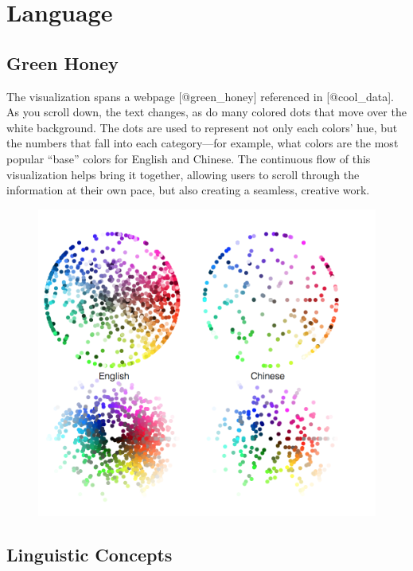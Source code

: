 \documentclass[]{book}
\theoremstyle{definition}
\theoremstyle{definition}
\theoremstyle{definition}
\theoremstyle{remark}
\begin{document}
\section{Language}\label{language}

\subsection{Green Honey}\label{green-honey}

The visualization spans a webpage {[}@green\_honey{]} referenced in
{[}@cool\_data{]}. As you scroll down, the text changes, as do many
colored dots that move over the white background. The dots are used to
represent not only each colors' hue, but the numbers that fall into each
category---for example, what colors are the most popular ``base'' colors
for English and Chinese. The continuous flow of this visualization helps
bring it together, allowing users to scroll through the information at
their own pace, but also creating a seamless, creative work.

\begin{figure}
\centering
\includegraphics{images/colorwords.png}
\caption{}
\end{figure}

\subsection{Linguistic Concepts}\label{linguistic-concepts}
\end{document}
